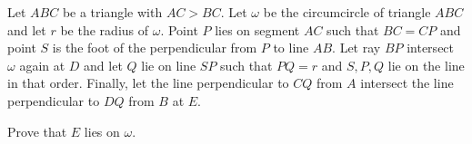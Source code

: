Let $ABC$ be a triangle with $AC > BC$. Let $\omega$ be the circumcircle of triangle $ABC$ and let $r$ be the radius of $\omega$. Point $P$ lies on segment $AC$ such that $BC = CP$ and point $S$ is the foot of the perpendicular from $P$ to line $AB$. Let ray $BP$ intersect $\omega$ again at $D$ and let $Q$ lie on line $SP$ such that $PQ = r$ and $S, P, Q$ lie on the line in that order. Finally, let the line perpendicular to $CQ$ from $A$ intersect the line perpendicular to $DQ$ from $B$ at $E$.

Prove that $E$ lies on $\omega$.
